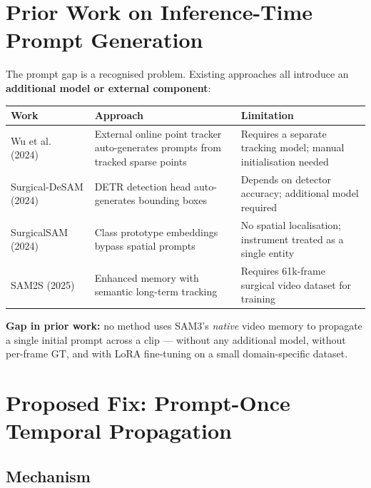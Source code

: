 \documentclass[11pt, a4paper]{article}
\begin{document}
\section{Prior Work on Inference-Time Prompt Generation}

The prompt gap is a recognised problem. Existing approaches all introduce
an \textbf{additional model or external component}:

\begin{center}
\begin{tabular}{p{3.5cm} p{4cm} p{5cm}}
\toprule
\textbf{Work} & \textbf{Approach} & \textbf{Limitation} \\
\midrule
Wu et al.~\cite{wu2024pointtracking} (2024) &
    External online point tracker auto-generates prompts from tracked sparse points &
    Requires a separate tracking model; manual initialisation needed \\
Surgical-DeSAM (2024) &
    DETR detection head auto-generates bounding boxes &
    Depends on detector accuracy; additional model required \\
SurgicalSAM~\cite{yue2024surgicalsam} (2024) &
    Class prototype embeddings bypass spatial prompts &
    No spatial localisation; instrument treated as a single entity \\
SAM2S (2025) &
    Enhanced memory with semantic long-term tracking &
    Requires 61k-frame surgical video dataset for training \\
\bottomrule
\end{tabular}
\end{center}

\noindent \textbf{Gap in prior work:} no method uses SAM3's \textit{native} video
memory to propagate a single initial prompt across a clip --- without any
additional model, without per-frame GT, and with LoRA fine-tuning on a
small domain-specific dataset.

\section{Proposed Fix: Prompt-Once Temporal Propagation}

\subsection{Mechanism}
\end{document}
